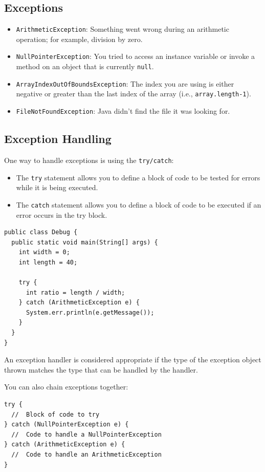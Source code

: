 \documentclass[a4paper, 12pt]{article}
\begin{document}
\subsection{Exceptions}
\begin{itemize}
\item \verb|ArithmeticException|: Something went wrong during an arithmetic operation; for example, division by zero.

\item \verb|NullPointerException|: You tried to access an instance variable or invoke a method on an object that is currently \verb|null|.

\item \verb|ArrayIndexOutOfBoundsException|: The index you are using is either negative or greater than the last index of the array (i.e., \verb|array.length-1|).

\item \verb|FileNotFoundException|: Java didn't find the file it was looking for.

\end{itemize}

\subsection{Exception Handling}
One way to handle exceptions is using the \verb|try/catch|:
\begin{itemize}
\item The \verb|try| statement allows you to define a block of code to be tested for errors while it is being executed.

\item The \verb|catch| statement allows you to define a block of code to be executed if an error occurs in the try block.

\end{itemize}
\begin{verbatim}
public class Debug {
  public static void main(String[] args) {    
    int width = 0;
    int length = 40;
    
    try {
      int ratio = length / width;
    } catch (ArithmeticException e) {
      System.err.println(e.getMessage());
    }    
  }  
}
\end{verbatim}
An exception handler is considered appropriate if the type of the exception object thrown matches the type that can be handled by the handler.

You can also chain exceptions together:
\begin{verbatim}
try {
  //  Block of code to try
} catch (NullPointerException e) {
  //  Code to handle a NullPointerException
} catch (ArithmeticException e) {
  //  Code to handle an ArithmeticException
}
\end{verbatim}
\end{document}
